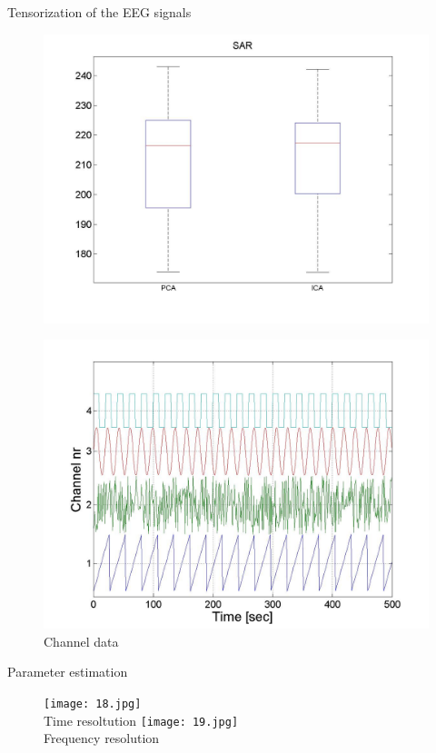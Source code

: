 \documentclass[t,12pt,english
\ifx\beamermode\undefined\else,\beamermode\fi
]{beamer}
\begin{document}
\begin{frame}{Tensorization of the EEG signals}
\begin{figure}[!htbp]
\includegraphics[width=1\textwidth]{17.jpg}
\endminipage\hfill
\end{figure}

\begin{figure}[!htbp]
\centering
\includegraphics[width=.4\textwidth]{14.jpg}\\
\tiny {Channel data}\label{a17}
\end{figure}

\end{frame}



\begin{frame}{Parameter estimation}
 
 \begin{figure}[!htbp]
%
\centering
\texttt{[image: 18.jpg]}\\
\tiny{Time resoltution}\label{a18}
\endminipage\hfill
{}%
\centering
\texttt{[image: 19.jpg]}\\
\tiny{Frequency resolution}\label{a19}
\endminipage\hfill
\end{figure}

\end{frame}
\end{document}
